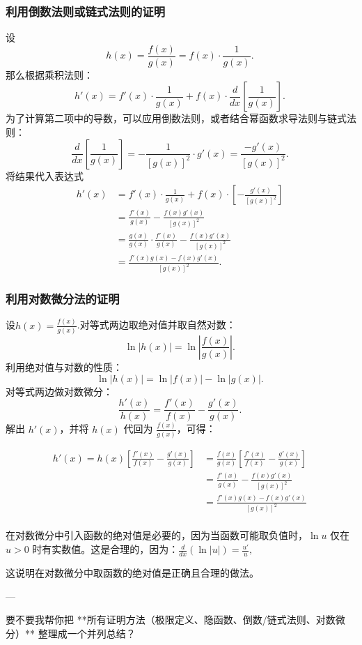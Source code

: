 \subsubsection{利用倒数法则或链式法则的证明}
设
$$
h(x) = \frac{f(x)}{g(x)} = f(x) \cdot \frac{1}{g(x)}.~
$$
那么根据乘积法则：
$$
h'(x) = f'(x)\cdot \frac{1}{g(x)} + f(x)\cdot \frac{d}{dx}\left[\frac{1}{g(x)}\right].~
$$
为了计算第二项中的导数，可以应用倒数法则，或者结合幂函数求导法则与链式法则：
$$
\frac{d}{dx}\left[\frac{1}{g(x)}\right] = -\frac{1}{[g(x)]^2}\cdot g'(x) = \frac{-g'(x)}{[g(x)]^2}.~
$$
将结果代入表达式
$$
\begin{aligned}
h'(x) &= f'(x)\cdot \frac{1}{g(x)} + f(x)\cdot \left[-\frac{g'(x)}{[g(x)]^2}\right]\\
&= \frac{f'(x)}{g(x)} - \frac{f(x)g'(x)}{[g(x)]^2}\\
&= \frac{g(x)}{g(x)} \cdot \frac{f'(x)}{g(x)} - \frac{f(x)g'(x)}{[g(x)]^2}\\
&= \frac{f'(x)g(x) - f(x)g'(x)}{[g(x)]^2}.
\end{aligned}~
$$
\subsubsection{利用对数微分法的证明}
设$h(x) = \frac{f(x)}{g(x)}$.对等式两边取绝对值并取自然对数：
$$
\ln |h(x)| = \ln \left|\frac{f(x)}{g(x)}\right|.~
$$
利用绝对值与对数的性质：
$$
\ln |h(x)| = \ln |f(x)| - \ln |g(x)|.~
$$
对等式两边做对数微分：
$$
\frac{h'(x)}{h(x)} = \frac{f'(x)}{f(x)} - \frac{g'(x)}{g(x)}.~
$$
解出 $h'(x)$，并将 $h(x)$ 代回为 $\tfrac{f(x)}{g(x)}$，可得：

$$
\begin{aligned}
h'(x) = h(x)\left[\frac{f'(x)}{f(x)} - \frac{g'(x)}{g(x)}\right]
&= \frac{f(x)}{g(x)}\left[\frac{f'(x)}{f(x)} - \frac{g'(x)}{g(x)}\right]\\
&= \frac{f'(x)}{g(x)} - \frac{f(x)g'(x)}{[g(x)]^2}\\
&= \frac{f'(x)g(x) - f(x)g'(x)}{[g(x)]^2}\\
\end{aligned}~
$$

在对数微分中引入函数的绝对值是必要的，因为当函数可能取负值时，$\ln u$ 仅在 $u>0$ 时有实数值。这是合理的，因为：$\frac{d}{dx}(\ln |u|) = \frac{u'}{u},$

这说明在对数微分中取函数的绝对值是正确且合理的做法。

---

要不要我帮你把 **所有证明方法（极限定义、隐函数、倒数/链式法则、对数微分）** 整理成一个并列总结？
